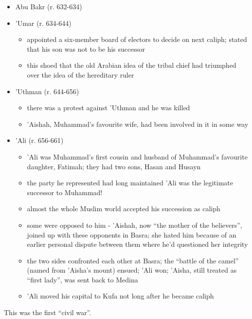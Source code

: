\documentclass[
]{book}
\providecommand{\tightlist}{%
  \setlength{\itemsep}{0pt}\setlength{\parskip}{0pt}}
\begin{document}
\begin{itemize}
\item
  Abu Bakr (r. 632-634)
\item
  'Umar (r. 634-644)

  \begin{itemize}
  \tightlist
  \item
    appointed a six-member board of electors to decide on next caliph;
    stated that his son was not to be his successor
  \item
    this shoed that the old Arabian idea of the tribal chief had
    triumphed over the idea of the hereditary ruler
  \end{itemize}
\item
  'Uthman (r. 644-656)

  \begin{itemize}
  \tightlist
  \item
    there was a protest against 'Uthman and he was killed
  \item
    'Aishah, Muhammad's favourite wife, had been involved in it in some
    way
  \end{itemize}
\item
  'Ali (r. 656-661)

  \begin{itemize}
  \tightlist
  \item
    'Ali was Muhammad's first cousin and husband of Muhammad's favourite
    daughter, Fatimah; they had two sons, Hasan and Husayn
  \item
    the party he represented had long maintained 'Ali was the legitimate
    successor to Muhammad!
  \item
    almost the whole Muslim world accepted his succession as caliph
  \item
    some were opposed to him - 'Aishah, now ``the mother of the
    believers'', joined up with these opponents in Basra; she hated him
    because of an earlier personal dispute between them where he'd
    questioned her integrity
  \item
    the two sides confronted each other at Basra; the ``battle of the
    camel'' (named from 'Aisha's mount) ensued; 'Ali won; 'Aisha, still
    treated as ``first lady'', was sent back to Medina
  \item
    'Ali moved his capital to Kufa not long after he became caliph
  \end{itemize}
\end{itemize}

This was the first ``civil war''.
\end{document}
